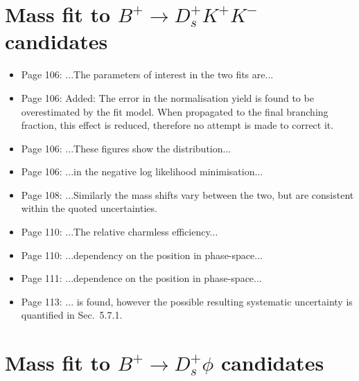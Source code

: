\documentclass[12pt]{article}
\begin{document}
\section{Mass fit to $B^+ \rightarrow D_s^+ K^+K^-$ candidates}

\begin{itemize}
\item Page 106: ...The parameters of interest {\color{red}in the two fits are}...
\item Page 106: Added: {\color{red} The error in the normalisation yield is found to be overestimated by the fit model. When propagated to the final branching fraction, this effect is reduced, therefore no attempt is made to correct it.}
\item Page 106: ...These figures {\color{red}show} the distribution...
\item Page 106: ...in the {\color{red}negative log likelihood} minimisation...
\item Page 108: ...Similarly the mass shifts vary between the two, {\color{red}but are consistent within the quoted uncertainties.}
\item Page 110: ...{\color{red}The} relative charmless efficiency...
\item Page 110: ...dependency {\color{red}on the position} in phase-space...
\item Page 111: ...dependence on the position {\color{red}in phase-space}...
\item Page 113: ... is found, {\color{red}however the possible resulting systematic uncertainty is quantified in Sec.~5.7.1.}

\end{itemize}
\section{Mass fit to $B^+ \rightarrow D_s^+ \phi$ candidates}
\end{document}
